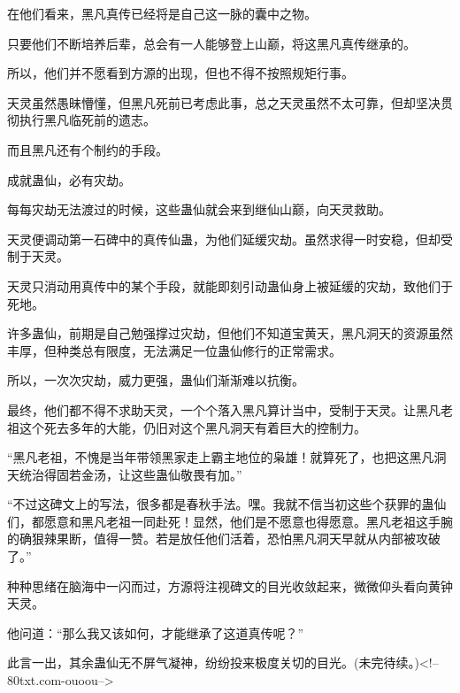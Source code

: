 \begin{this_body}
在他们看来，黑凡真传已经将是自己这一脉的囊中之物。

只要他们不断培养后辈，总会有一人能够登上山巅，将这黑凡真传继承的。

所以，他们并不愿看到方源的出现，但也不得不按照规矩行事。

天灵虽然愚昧懵懂，但黑凡死前已考虑此事，总之天灵虽然不太可靠，但却坚决贯彻执行黑凡临死前的遗志。

而且黑凡还有个制约的手段。

成就蛊仙，必有灾劫。

每每灾劫无法渡过的时候，这些蛊仙就会来到继仙山巅，向天灵救助。

天灵便调动第一石碑中的真传仙蛊，为他们延缓灾劫。虽然求得一时安稳，但却受制于天灵。

天灵只消动用真传中的某个手段，就能即刻引动蛊仙身上被延缓的灾劫，致他们于死地。

许多蛊仙，前期是自己勉强撑过灾劫，但他们不知道宝黄天，黑凡洞天的资源虽然丰厚，但种类总有限度，无法满足一位蛊仙修行的正常需求。

所以，一次次灾劫，威力更强，蛊仙们渐渐难以抗衡。

最终，他们都不得不求助天灵，一个个落入黑凡算计当中，受制于天灵。让黑凡老祖这个死去多年的大能，仍旧对这个黑凡洞天有着巨大的控制力。

“黑凡老祖，不愧是当年带领黑家走上霸主地位的枭雄！就算死了，也把这黑凡洞天统治得固若金汤，让这些蛊仙敬畏有加。”

“不过这碑文上的写法，很多都是春秋手法。嘿。我就不信当初这些个获罪的蛊仙们，都愿意和黑凡老祖一同赴死！显然，他们是不愿意也得愿意。黑凡老祖这手腕的确狠辣果断，值得一赞。若是放任他们活着，恐怕黑凡洞天早就从内部被攻破了。”

种种思绪在脑海中一闪而过，方源将注视碑文的目光收敛起来，微微仰头看向黄钟天灵。

他问道：“那么我又该如何，才能继承了这道真传呢？”

此言一出，其余蛊仙无不屏气凝神，纷纷投来极度关切的目光。(未完待续。)<!--80txt.com-ouoou-->

\end{this_body}

